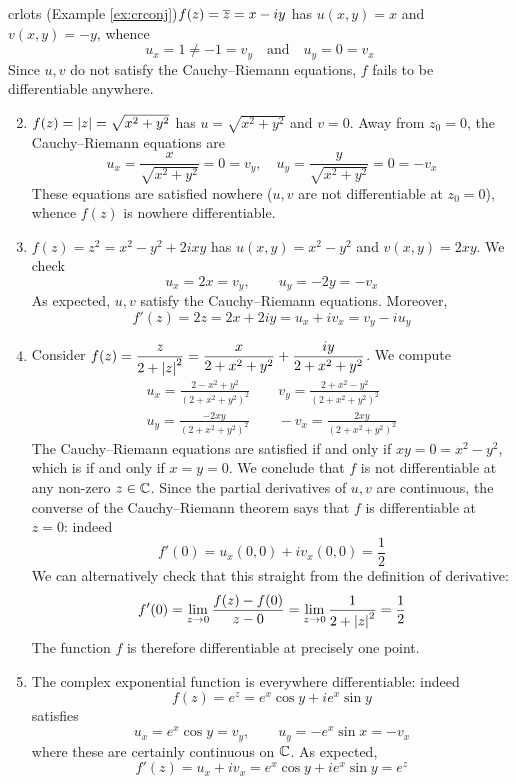 \begin{examples}{}{crlots}
\exstart (Example \ref{ex:crconj})\lstsp $f(z)=\overline{z}=x-iy$ has $u(x,y)=x$ and $v(x,y)=-y$, whence
  \[
  	u_x=1\neq -1=v_y \quad\text{and}\quad u_y=0=v_x
  \]
  Since $u,v$ do not satisfy the Cauchy--Riemann equations, $f$ fails to be differentiable anywhere.
  
	\begin{enumerate}\setcounter{enumi}{1}
	  \item\label{exs:modnotdiff} $f(z)=\left| z\right|=\sqrt{x^2+y^2}$ has $u=\sqrt{x^2+y^2}$ and $v=0$. Away from $z_0=0$, the Cauchy--Riemann equations are
	  \[
	  	u_x=\frac{x}{\sqrt{x^2+y^2}}=0=v_y,\quad u_y=\frac{y}{\sqrt{x^2+y^2}}=0=-v_x
	  \]
	  These equations are satisfied nowhere ($u,v$ are not differentiable at $z_0=0$), whence $f(z)$ is nowhere differentiable.
	  
	  \item $f(z)=z^2=x^2-y^2+2ixy$ has $u(x,y)=x^2-y^2$ and $v(x,y)=2xy$. We check
	  \[
	  	u_x=2x=v_y,\qquad u_y=-2y=-v_x
	  \]
	  As expected, $u,v$ satisfy the Cauchy--Riemann equations. Moreover,
	  \[
	  	f'(z)=2z=2x+2iy =u_x+iv_x =v_y-iu_y
	  \]
	  
	  \item\label{ex:cr3} Consider $\displaystyle f(z)=\frac z{2+\left| z\right|^2}=\frac x{2+x^2+y^2}+\frac{iy}{2+x^2+y^2}$. We compute
	  \begin{gather*}
	  	u_x=\frac{2-x^2+y^2}{(2+x^2+y^2)^2} \qquad v_y=\frac{2+x^2-y^2}{(2+x^2+y^2)^2}\\
	  	u_y=\frac{-2xy}{(2+x^2+y^2)^2} \qquad -v_x=\frac{2xy}{(2+x^2+y^2)^2}
	  \end{gather*}
	  The Cauchy--Riemann equations are satisfied if and only if $xy=0=x^2-y^2$, which is if and only if $x=y=0$. We conclude that $f$ is not differentiable at any non-zero $z\in\mathbb{C}$.\smallbreak
	  Since the partial derivatives of $u,v$ are continuous, the converse of the Cauchy--Riemann theorem says that $f$ is differentiable at $z=0$: indeed
  	\[
  		f'(0)=u_x(0,0)+iv_x(0,0)=\frac 12
  	\]
	  We can alternatively check that this straight from the definition of derivative:
	  \[f'(0)=\lim_{z\to 0}\frac{f(z)-f(0)}{z-0}=\lim_{z\to 0}\frac 1{2+\left| z\right|^2}=\frac 12\]
	  The function $f$ is therefore differentiable at precisely one point.
	  
		\item\label{ex:crexex2} The complex exponential function is everywhere differentiable: indeed
  	\[
  		f(z)=e^z=e^x\cos y+ie^x\sin y
  	\]
  	satisfies
  	\[
  		u_x=e^x\cos y=v_y,\qquad u_y=-e^x\sin x=-v_x
  	\]
  	where these are certainly continuous on $\mathbb{C}$. As expected,
  	\[
  		f'(z)=u_x+iv_x=e^x\cos y+ie^x\sin y =e^z
  	\]
	\end{enumerate}
\end{examples}

